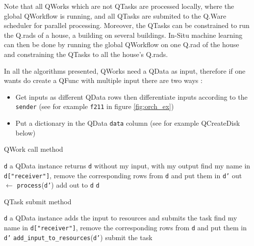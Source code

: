 \documentclass[10pt, conference, compsocconf]{IEEEtran}
\begin{document}
Note that all QWorks which are not QTasks are processed locally, where the global QWorkflow is running, and all QTasks are submited to the Q.Ware scheduler for parallel processing. Moreover, the QTasks can be constrained to run the Q.rads of a house, a building on several buildings. In-Situ machine learning can then be done by running the global QWorkflow on one Q.rad of the house and constraining the QTasks to all the house's Q.rads.

In all the algorithms presented, QWorks need a QData as input, therefore if one wants do create a QFunc with multiple input there are two ways :
\begin{itemize}
\item Get inputs as different QData rows then differentiate inputs according to the \texttt{sender} (see for example \texttt{f211} in figure \ref{fig:orch_ex})
\item Put a dictionary in the QData \texttt{data} column (see for example QCreateDisk below)
\end{itemize}

\begin{algorithm}[H]
\caption{QWork call method}
\label{alg:Qwork}
\begin{algorithmic}
\REQUIRE \texttt{d} a QData instance
\ENSURE returns \texttt{d} without my input, with my output
\STATE find my name in \texttt{d["receiver"]}, remove the corresponding rows from \texttt{d} and put them in \texttt{d'}
\STATE out $\leftarrow$ \texttt{process}(\texttt{d'})
\STATE add out to \texttt{d}
\RETURN \texttt{d}
\end{algorithmic}
\end{algorithm}

\begin{algorithm}[H]
\caption{QTask submit method}
\label{alg:Qtask}
\begin{algorithmic}
\REQUIRE \texttt{d} a QData instance
\ENSURE adds the input to resources and submits the task
\STATE find my name in \texttt{d["receiver"]}, remove the corresponding rows from \texttt{d} and put them in \texttt{d'}
\STATE \texttt{add\_input\_to\_resources}(\texttt{d'})
\STATE submit the task
\end{algorithmic}
\end{algorithm}
\end{document}
